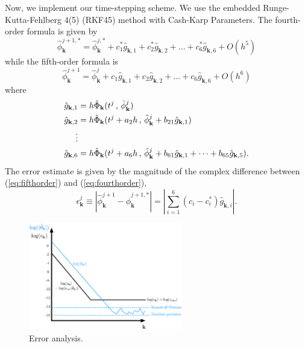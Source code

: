 \documentclass[12pt]{article}
\begin{document}
Now, we implement our time-stepping scheme. We use the embedded Runge-Kutta-Fehlberg 4(5) (RKF45) method with Cash-Karp Parameters.  The fourth-order formula is given by 
\begin{equation}
\label{eq:fourthorder}
\hat{\phi}_{\mathbf{k}}^{j+1 , *}=\hat{\phi}_{\mathbf{k}}^{j, *}+c_{1}^{*}\hat{g}_{\mathbf{k},1}  + c_{2}^{*}\hat{g}_{\mathbf{k},2} + \dots +  c_{6}^{*}\hat{g}_{\mathbf{k},6} + O(h^{5})
\end{equation}
while the fifth-order formula is 
\begin{equation}
\label{eq:fifthorder}
\hat{\phi}_{\mathbf{k}}^{j+1}=\hat{\phi}_{\mathbf{k}}^{j}+c_{1}\hat{g}_{\mathbf{k},1}  + c_{2}\hat{g}_{\mathbf{k},2} + \dots +  c_{6}\hat{g}_{\mathbf{k},6}  + O(h^{6})
\end{equation}
where 
\begin{subequations}
	\begin{align}
		\hat{g}_{\mathbf{k},1} & = h \hat{\Phi}_{\mathbf{k}}(t^{j} \, , \, \hat{\phi}^{j}_{\mathbf{k}}) \\
		\hat{g}_{\mathbf{k},2} & = h \hat{\Phi}_{\mathbf{k}}(t^{j}+a_{2}h \, , \, \hat{\phi}^{j}_{\mathbf{k}} + b_{21}\hat{g}_{\mathbf{k},1}  ) \\
		\notag
		\vdots \\
		\hat{g}_{\mathbf{k},6} & = h \hat{\Phi}_{\mathbf{k}}(t^{j}+a_{6}h \, , \, \hat{\phi}^{j}_{\mathbf{k}} + b_{61}\hat{g}_{\mathbf{k},1}  + \dots +    b_{65}\hat{g}_{\mathbf{k},5} ) .
	\end{align}
\end{subequations}
The error estimate is given by the magnitude of the complex difference between (\ref{eq:fifthorder}) and (\ref{eq:fourthorder}),
\begin{equation}
\epsilon_{\mathbf{k}}^{j}\equiv |\hat{\phi}_{\mathbf{k}}^{j+1}-\hat{\phi}_{\mathbf{k}}^{j+1,*}| = \left|\sum_{i=1}^{6} (c_{i}-c_{i}^{*})\hat{g
}_{\mathbf{k},i} \right| .
\end{equation}
\begin{figure}
	\centering
	\includegraphics[width=0.6\textwidth]{spectrum_errors.eps}
	\caption{Error analysis.}
	\label{fig:spectrum_errors}
\end{figure}
\end{document}
